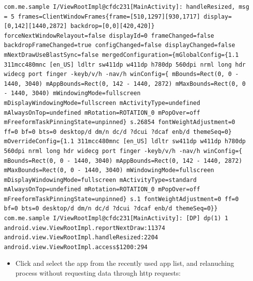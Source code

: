 \documentclass[9pt, b5paper]{article}
\begin{document}
\begin{verbatim}
com.me.sample I/ViewRootImpl@cfdc231[MainActivity]: handleResized, msg = 5 frames=ClientWindowFrames{frame=[510,1297][930,1717] display=[0,142][1440,2872] backdrop=[0,0][420,420]} forceNextWindowRelayout=false displayId=0 frameChanged=false backdropFrameChanged=true configChanged=false displayChanged=false mNextDrawUseBlastSync=false mergedConfiguration={mGlobalConfig={1.1 311mcc480mnc [en_US] ldltr sw411dp w411dp h780dp 560dpi nrml long hdr widecg port finger -keyb/v/h -nav/h winConfig={ mBounds=Rect(0, 0 - 1440, 3040) mAppBounds=Rect(0, 142 - 1440, 2872) mMaxBounds=Rect(0, 0 - 1440, 3040) mWindowingMode=fullscreen mDisplayWindowingMode=fullscreen mActivityType=undefined mAlwaysOnTop=undefined mRotation=ROTATION_0 mPopOver=off mFreeformTaskPinningState=unpinned} s.26854 fontWeightAdjustment=0 ff=0 bf=0 bts=0 desktop/d dm/n dc/d ?dcui ?dcaf enb/d themeSeq=0} mOverrideConfig={1.1 311mcc480mnc [en_US] ldltr sw411dp w411dp h780dp 560dpi nrml long hdr widecg port finger -keyb/v/h -nav/h winConfig={ mBounds=Rect(0, 0 - 1440, 3040) mAppBounds=Rect(0, 142 - 1440, 2872) mMaxBounds=Rect(0, 0 - 1440, 3040) mWindowingMode=fullscreen mDisplayWindowingMode=fullscreen mActivityType=standard mAlwaysOnTop=undefined mRotation=ROTATION_0 mPopOver=off mFreeformTaskPinningState=unpinned} s.1 fontWeightAdjustment=0 ff=0 bf=0 bts=0 desktop/d dm/n dc/d ?dcui ?dcaf enb/d themeSeq=0}}
com.me.sample I/ViewRootImpl@cfdc231[MainActivity]: [DP] dp(1) 1 android.view.ViewRootImpl.reportNextDraw:11374 android.view.ViewRootImpl.handleResized:2204 android.view.ViewRootImpl.access$1200:294
\end{verbatim}
\begin{itemize}
\item Click and select the app from the recently used app list, and relanuching process without requesting data through http requests:
\end{itemize}
\end{document}
